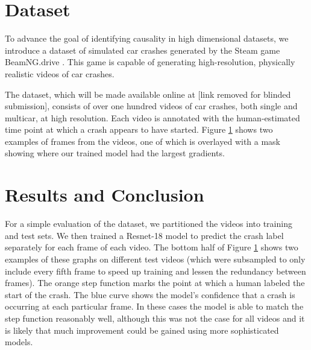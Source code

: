 \documentclass[letterpaper, twocolumn]{article} %
\begin{document}
\begin{figure}
\label{fig:carframes}
\end{figure}



\section{Dataset}

To advance the goal of identifying causality in high dimensional datasets, we introduce a dataset of simulated car crashes generated by the Steam game BeamNG.drive \cite{beamng}. This game is capable of generating high-resolution, physically realistic videos of car crashes.

The dataset, which will be made available online at [link removed for blinded submission], consists of over one hundred videos of car crashes, both single and multicar, at high resolution. Each video is annotated with the human-estimated time point at which a crash appears to have started. Figure \ref{fig:carframes} shows two examples of frames from the videos, one of which is overlayed with a mask showing where our trained model had the largest gradients.

\vspace{-0.3cm}




\section{Results and Conclusion}

For a simple evaluation of the dataset, we partitioned the videos into training and test sets. We then trained a Resnet-18 model to predict the crash label separately for each frame of each video. The bottom half of Figure \ref{fig:carframes} shows two examples of these graphs on different test videos (which were subsampled to only include every fifth frame to speed up training and lessen the redundancy between frames). The orange step function marks the point at which a human labeled the start of the crash. The blue curve shows the model's confidence that a crash is occurring at each particular frame. In these cases the model is able to match the step function reasonably well, although this was not the case for all videos and it is likely that much improvement could be gained using more sophisticated models.
\end{document}
